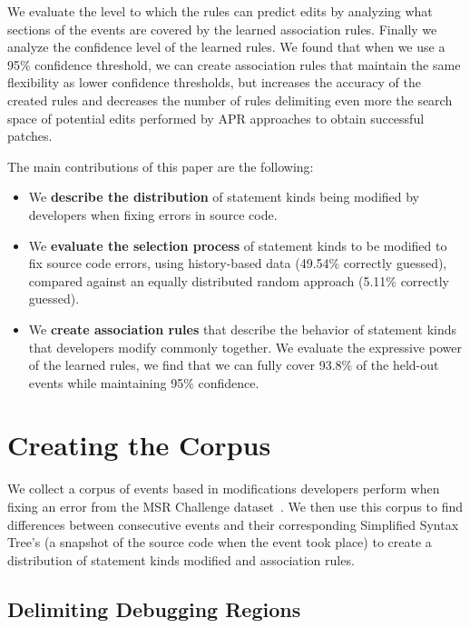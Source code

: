 \documentclass[sigconf]{acmart}
\begin{document}
We evaluate the level to which the rules can predict edits
by analyzing what sections of the events are covered by the 
learned association rules. 
Finally we analyze
the confidence level of the learned rules. 
We found that when we use a 95\% confidence
threshold, we can create association
rules that maintain the same flexibility as 
lower confidence thresholds, but increases
the accuracy of the created rules and decreases the number of rules
delimiting even more the search space of potential edits
performed by APR approaches to obtain successful patches.

The main contributions of this paper are the following:
\begin{itemize}
\item We \textbf{describe the distribution} of statement kinds being
modified by developers when fixing errors in source code. 

\item We \textbf{evaluate
the selection process} of statement kinds to be modified
to fix source code errors, using history-based data (49.54\% correctly guessed), compared against
an equally distributed random approach (5.11\% correctly guessed).

\item We \textbf{create association rules} that describe the behavior
of statement kinds that developers modify commonly together. 
We evaluate the expressive power of the learned rules, we find
that we can fully cover 93.8\% of the held-out events while maintaining
95\% confidence.

\end{itemize}

\section{Creating the Corpus}

We collect a corpus of events based in modifications 
developers perform when fixing an error from the MSR Challenge 
dataset~\cite{msr18challenge}. We then
use this corpus to find differences between consecutive events
and their corresponding Simplified Syntax Tree's (a snapshot of
the source code when the event took place) to create a distribution 
of statement kinds modified and association rules.

\subsection{Delimiting Debugging Regions}
\label{delimitDebugRegions}
\end{document}
